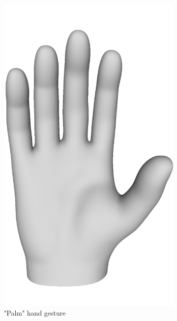 \documentclass{ieeeaccess}
\begin{document}
\begin{figure}
     \centering
     \begin{subfigure}[b]{0.2\textwidth}
         \centering
         \includegraphics[width=\textwidth]{palm3D.png}
         \caption{"Palm" hand gesture}
         \label{fig:palm}
     \end{subfigure}
     \hfill
     \begin{subfigure}[b]{0.2\textwidth}
         \centering

\end{subfigure}
\end{figure}
\end{document}
